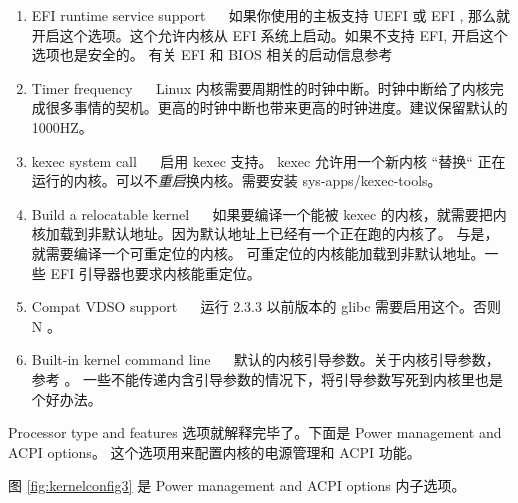 \begin{enumerate}
\item EFI runtime service support ~~ 如果你使用的主板支持 UEFI 或 EFI , 那么就开启这个选项。这个允许内核从 EFI 系统上启动。如果不支持 EFI, 开启这个选项也是安全的。 有关 EFI 和 BIOS 相关的启动信息参考  

\item Timer frequency ~~ Linux 内核需要周期性的时钟中断。时钟中断给了内核完成很多事情的契机。更高的时钟中断也带来更高的时钟进度。建议保留默认的 1000HZ。

\item kexec system call ~~ 启用 kexec 支持。 kexec 允许用一个新内核 “替换“ 正在运行的内核。可以不\textit{重启}换内核。需要安装 sys-apps/kexec-tools。


\item Build a relocatable kernel ~~ 如果要编译一个能被 kexec 的内核，就需要把内核加载到非默认地址。因为默认地址上已经有一个正在跑的内核了。 与是，就需要编译一个可重定位的内核。 可重定位的内核能加载到非默认地址。一些 EFI 引导器也要求内核能重定位。

\item Compat VDSO support ~~ 运行 2.3.3 以前版本的 glibc 需要启用这个。否则 N 。

\item Built-in kernel command line ~~ 默认的内核引导参数。关于内核引导参数，参考  。 一些不能传递内含引导参数的情况下，将引导参数写死到内核里也是个好办法。

\end{enumerate}

Processor type and features 选项就解释完毕了。下面是 Power management and ACPI options。 这个选项用来配置内核的电源管理和 ACPI 功能。

图 \ref{fig:kernelconfig3} 是 Power management and ACPI options 内子选项。



